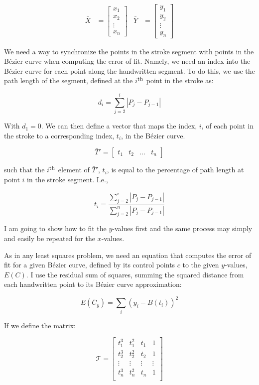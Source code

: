 \documentclass{article}
\newcommand{\Ith}{\ensuremath{i^\textrm{\footnotesize th}}}
\begin{document}
\begin{align*}
  \bar{X} &= \left[\begin{array}{c}x_1\\x_2\\\vdots\\x_n\end{array}\right] &
  \bar{Y} &= \left[\begin{array}{c}y_1\\y_2\\\vdots\\y_n\end{array}\right]
\end{align*}

We need a way to synchronize the points in the stroke segment with points in the B\'ezier curve when computing the error of fit. Namely, we need an index into the B\'ezier curve for each point along the handwritten segment. To do this, we use the path length of the segment, defined at the $\Ith$ point in the stroke as:

\[d_i=\sum_{j=2}^{i}|P_j-P_{j-1}|\]

With $d_1=0$.  We can then define a vector that maps the index, $i$, of each point in the stroke to a corresponding index, $t_i$, in the B\'ezier curve.

\[\bar{T}'=[\begin{array}{cccc} t_1 & t_2 & \ldots & t_n \end{array}]\]

such that the $\Ith$ element of $\bar{T}'$, $t_i$, is equal to the percentage of path length at point $i$ in the stroke segment.  I.e.,

\[t_i=\frac{\sum_{j=2}^{i}|P_j-P_{j-1}|}{\sum_{j=2}^{n}|P_j-P_{j-1}|}\]

I am going to show how to fit the $y$-values first and the same process may simply and easily be repeated for the $x$-values.

As in any least squares problem, we need an equation that computes the error of fit for a given B\'ezier curve, defined by its control points $c$ to the given $y$-values, $E(C)$. I use the residual sum of squares, summing the squared distance from each handwritten point to its B\'ezier curve approximation:

\[E(\bar{C}_y)=\sum_i(y_i-B(t_i))^2\]

If we define the matrix:

\[\mathcal{T}=\left[\begin{array}{rrrr}
       t_1^3 &  t_1^2 &  t_1   &      1 \\
       t_2^3 &  t_2^2 &  t_2   &      1 \\
      \vdots & \vdots & \vdots & \vdots \\
       t_n^3 &  t_n^2 &  t_n   &      1 \\
\end{array}\right]\]
\end{document}
